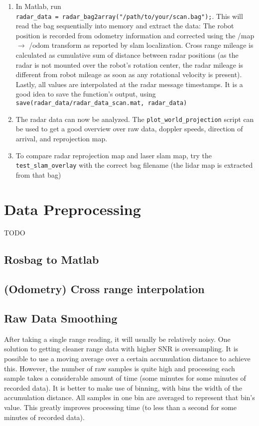 \begin{enumerate}
\item
  In Matlab, run
  \texttt{radar\_data\ =\ radar\_bag2array("/path/to/your/scan.bag");}.
  This will read the bag sequentially into memory and extract the data:
  The robot position is recorded from odometry information and corrected
  using the /map \(\rightarrow\) /odom transform as reported by slam
  localization. Cross range mileage is calculated as cumulative sum of
  distance between radar positions (as the radar is not mounted over the
  robot's rotation center, the radar mileage is different from robot
  mileage as soon as any rotational velocity is present). Lastly, all
  values are interpolated at the radar message timestamps. It is a good
  idea to save the function's output, using
  \texttt{save(\textquotesingle{}radar\_data/radar\_data\_scan.mat\textquotesingle{},\ \textquotesingle{}radar\_data\textquotesingle{})}
\item
  The radar data can now be analyzed. The
  \texttt{plot\_world\_projection} script can be used to get a good
  overview over raw data, doppler speeds, direction of arrival, and
  reprojection map.
\item
  To compare radar reprojection map and laser slam map, try the
  \texttt{test\_slam\_overlay} with the correct bag filename (the lidar
  map is extracted from that bag)
\end{enumerate}

\section{Data Preprocessing}\label{data-preprocessing}

TODO

\subsection{Rosbag to Matlab}\label{rosbag-to-matlab}

\subsection{(Odometry) Cross range
interpolation}\label{odometry-cross-range-interpolation}

\subsection{Raw Data Smoothing}\label{raw-data-smoothing}

After taking a single range reading, it will usually be relatively
noisy. One solution to getting cleaner range data with higher SNR is
oversampling. It is possible to use a moving average over a certain
accumulation distance to achieve this. However, the number of raw
samples is quite high and processing each sample takes a considerable
amount of time (some minutes for some minutes of recorded data). It is
better to make use of binning, with bins the width of the accumulation
distance. All samples in one bin are averaged to represent that bin's
value. This greatly improves processing time (to less than a second for
some minutes of recorded data).

